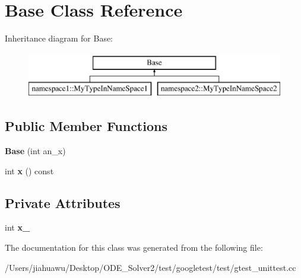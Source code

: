 \hypertarget{class_base}{}\section{Base Class Reference}
\label{class_base}
Inheritance diagram for Base\+:\begin{figure}[H]
\begin{center}
\leavevmode
\includegraphics[height=2.000000cm]{class_base}
\end{center}
\end{figure}
\subsection*{Public Member Functions}
\begin{DoxyCompactItemize}
\item 
\mbox{\label{class_base_a1d5f3fb92f8cbc687705785bdc6abd18}} 
{\bfseries Base} (int an\+\_\+x)
\item 
\mbox{\label{class_base_a779fd2b157ebd763b15383d96047e07c}} 
int {\bfseries x} () const
\end{DoxyCompactItemize}
\subsection*{Private Attributes}
\begin{DoxyCompactItemize}
\item 
\mbox{\label{class_base_a52a6455160a570c261fe257b5d785707}} 
int {\bfseries x\+\_\+}
\end{DoxyCompactItemize}


The documentation for this class was generated from the following file\+:\begin{DoxyCompactItemize}
\item 
/\+Users/jiahuawu/\+Desktop/\+O\+D\+E\+\_\+\+Solver2/test/googletest/test/gtest\+\_\+unittest.\+cc\end{DoxyCompactItemize}
